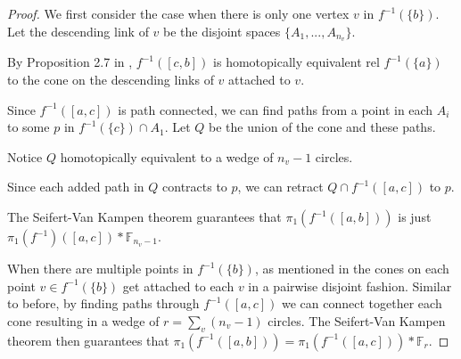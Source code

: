 \begin{proof}
We first consider the case when there is only one vertex \(v\) in \(f^{-1}(\{b\})\).
Let the descending link of \(v\) be the disjoint spaces \(\{A_1, ..., A_{n_v}\}\). 

By Proposition 2.7 in \cite{Bestvina2008PL}, \(f^{-1}([c,b])\) is homotopically equivalent
rel \(f^{-1}(\{a\})\) to the cone on the descending links of \(v\) attached to \(v\). 

Since \(f^{-1}([a,c])\) is path connected, 
we can find paths from a point in each \(A_i\) to some \(p\) in \(f^{-1}(\{c\}) \cap A_1\).
Let \(Q\) be the union of the cone and these paths.

Notice \(Q\) homotopically equivalent to a wedge of \(n_v - 1\) circles.

Since each added path in \(Q\) contracts to \(p\), we can retract \(Q \cap f^{-1}([a,c])\) to \(p\).

The Seifert-Van Kampen theorem guarantees that \(\pi_1(f^{-1}([a,b]))\) is just \(\pi_1(f^{-1})([a,c]) * \mathbb{F}_{n_v - 1}\).

When there are multiple points in \(f^{-1}(\{b\})\), as mentioned in \cite{Bestvina2008PL}
the cones on each point \(v \in f^{-1}(\{b\})\) get attached to each \(v\) in a pairwise disjoint fashion.
Similar to before, by finding paths through \(f^{-1}([a,c])\) we can connect together each cone
resulting in a wedge of \(r = \sum_{v} (n_v - 1)\) circles.
The Seifert-Van Kampen theorem then guarantees that
\(\pi_1(f^{-1}([a,b])) = \pi_1(f^{-1}([a,c])) * \mathbb{F}_r\).

\end{proof}